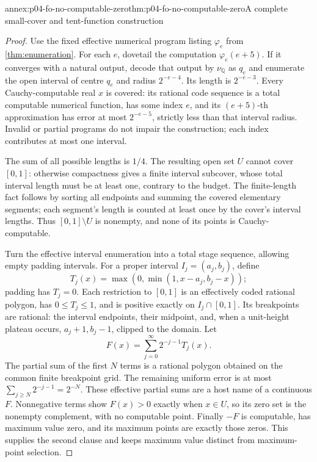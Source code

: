 \begin{annexitem}{annex:p04-fo-no-computable-zero}{thm:p04-fo-no-computable-zero}{A complete small-cover and tent-function construction}
\begin{proof}
Use the fixed effective numerical program listing
\(\varphi_e\) from \cref{thm:enumeration}.
For each \(e\), dovetail the computation
\(\varphi_e(e+5)\). If it converges with a natural output,
decode that output by \(\nu_{\mathbb Q}\) as \(q_e\) and
enumerate the open interval of centre \(q_e\) and radius
\(2^{-e-4}\). Its length is \(2^{-e-3}\).
Every Cauchy-computable real \(x\) is covered: its rational
code sequence is a total computable numerical function,
has some index \(e\), and its \((e+5)\)-th approximation
has error at most \(2^{-e-5}\), strictly less than that
interval radius. Invalid or partial programs do not impair
the construction; each index contributes at most one interval.

The sum of all possible lengths is \(1/4\).
The resulting open set \(U\) cannot cover \([0,1]\):
otherwise compactness gives a finite interval subcover,
whose total interval length must be at least one, contrary
to the budget. The finite-length fact follows by sorting
all endpoints and summing the covered elementary segments;
each segment's length is counted at least once by the
cover's interval lengths.
Thus \([0,1]\setminus U\) is nonempty, and none of its
points is Cauchy-computable.

Turn the effective interval enumeration into a total
stage sequence, allowing empty padding intervals.
For a proper interval \(I_j=(a_j,b_j)\), define
\[
 T_j(x)=\max(0,\min(1,x-a_j,b_j-x));
\]
padding has \(T_j=0\).
Each restriction to \([0,1]\) is an effectively coded
rational polygon, has \(0\leq T_j\leq1\), and is positive
exactly on \(I_j\cap[0,1]\).
Its breakpoints are rational: the interval endpoints,
their midpoint, and, when a unit-height plateau occurs,
\(a_j+1,b_j-1\), clipped to the domain.
Let
\[
 F(x)=\sum_{j=0}^\infty 2^{-j-1}T_j(x).
\]
The partial sum of the first \(N\) terms is a rational
polygon obtained on the common finite breakpoint grid.
The remaining uniform error is at most
\(\sum_{j\geq N}2^{-j-1}=2^{-N}\).
These effective partial sums are a host name of a
continuous \(F\). Nonnegative terms show \(F(x)>0\)
exactly when \(x\in U\), so its zero set is the nonempty
complement, with no computable point.
Finally \(-F\) is computable, has maximum value zero,
and its maximum points are exactly those zeros.
This supplies the second clause and keeps maximum value
distinct from maximum-point selection.
\end{proof}
\end{annexitem}
